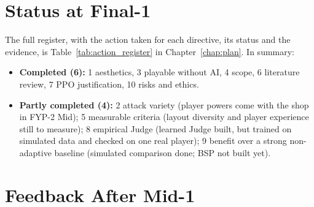 \section*{Status at Final-1}
The full register, with the action taken for each directive, its status and the evidence, is Table~\ref{tab:action_register} in Chapter~\ref{chap:plan}. In summary:
\begin{itemize}
    \item \textbf{Completed (6):} 1 aesthetics, 3 playable without AI, 4 scope, 6 literature review, 7 PPO justification, 10 risks and ethics.
    \item \textbf{Partly completed (4):} 2 attack variety (player powers come with the shop in FYP-2 Mid); 5 measurable criteria (layout diversity and player experience still to measure); 8 empirical Judge (learned Judge built, but trained on simulated data and checked on one real player); 9 benefit over a strong non-adaptive baseline (simulated comparison done; BSP not built yet).
\end{itemize}

\section*{Feedback After Mid-1}
